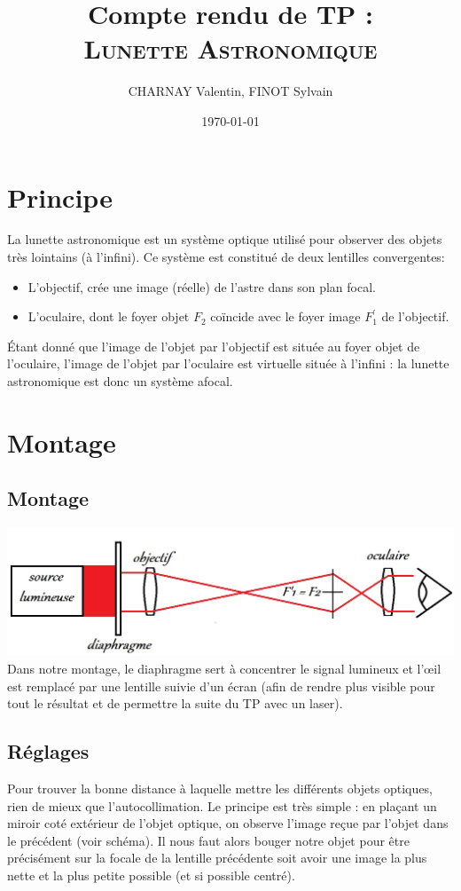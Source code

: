 \documentclass[12pt,a4paper]{article}
\author{CHARNAY Valentin, FINOT Sylvain}
\title{Compte rendu de TP :\\ \scshape Lunette Astronomique}
\date{\today}
\begin{document}
	\maketitle
	\section{Principe}
	La lunette astronomique est un système optique utilisé pour observer des objets très lointains (à l'infini). Ce système est constitué de deux lentilles convergentes:
	\begin{itemize}
		\item L'objectif, crée une image (réelle) de l'astre dans son plan focal.
		\item L'oculaire, dont le foyer objet $F_2$ coïncide avec le foyer image $F^{'}_1$
		de l'objectif.
	\end{itemize}
	Étant donné que l'image de l'objet par l'objectif est située au foyer objet de l'oculaire, l'image de l'objet par l'oculaire est virtuelle située à l'infini : la lunette astronomique est donc un système afocal.
	\section{Montage}
	\subsection{Montage}
	\includegraphics[scale=0.5]{schema5}
	Dans notre montage, le diaphragme sert à concentrer le signal lumineux et l'œil est remplacé par une lentille suivie d'un écran (afin de rendre plus visible pour tout le résultat et de permettre la suite du TP avec un laser).
	
	\subsection{Réglages}
	Pour trouver la bonne distance à laquelle mettre les différents objets optiques, rien de mieux que l'autocollimation. Le principe est très simple : en plaçant un miroir coté extérieur de l'objet optique, on observe l'image reçue par l'objet dans le précédent (voir schéma). Il nous faut alors bouger notre objet pour être précisément sur la focale de la lentille précédente soit avoir une image la plus nette et la plus petite possible (et si possible centré).
	
\end{document}
